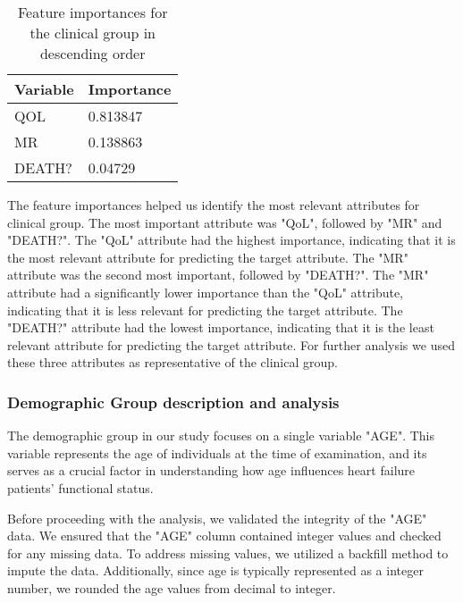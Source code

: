         \begin{table}[H]
            \centering
            \caption{Feature importances for the clinical group in descending order}
            \label{tab:clinical group feature importances}
            \begin{adjustbox}{center}
                \begin{tabular}{|l|l|}
                    \hline
                    \textbf{Variable} & \textbf{Importance} \\ \hline
                    QOL               & 0.813847         \\
                    MR                & 0.138863         \\
                    DEATH?            & 0.04729          \\ \hline
                    \end{tabular}
            \end{adjustbox}
        \end{table}

        The feature importances helped us identify the most relevant attributes for clinical group. The most important attribute was "QoL", followed by "MR" and "DEATH?". The "QoL" attribute had the highest importance, indicating that it is the most relevant attribute for predicting the target attribute. The "MR" attribute was the second most important, followed by "DEATH?". The "MR" attribute had a significantly lower importance than the "QoL" attribute, indicating that it is less relevant for predicting the target attribute. The "DEATH?" attribute had the lowest importance, indicating that it is the least relevant attribute for predicting the target attribute. For further analysis we used these three attributes as representative of the clinical group.
   
\subsubsection{Demographic Group description and analysis}
        
        The demographic group in our study focuses on a single variable "AGE". This variable represents the age of individuals at the time of examination, and its serves as a crucial factor in understanding how age influences heart failure patients' functional status.

        Before proceeding with the analysis, we validated the integrity of the "AGE" data. We ensured that the "AGE" column contained integer values and checked for any missing data. To address missing values, we utilized a backfill method to impute the data. Additionally, since age is typically represented as a integer number, we rounded the age values from decimal to integer. 
        
